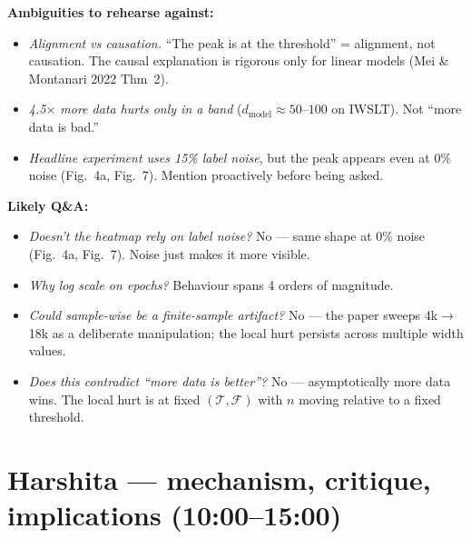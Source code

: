 \documentclass[10pt,a4paper]{article}
\newcommand{\spk}[2]{\textcolor{#1}{\textbf{#2}}}
\newcommand{\T}{\mathcal{T}}
\newcommand{\F}{\mathcal{F}}
\begin{document}
\textbf{Ambiguities to rehearse against:}
\begin{itemize}
\item \emph{Alignment vs causation.} ``The peak is at the threshold'' = alignment, not causation. The causal explanation is rigorous only for linear models (Mei \& Montanari 2022 Thm~2).
\item \emph{4.5\(\times\) more data hurts only in a band} (\(d_{\text{model}} \approx 50\text{--}100\) on IWSLT). Not ``more data is bad.''
\item \emph{Headline experiment uses 15\% label noise}, but the peak appears even at 0\% noise (Fig.~4a, Fig.~7). Mention proactively before being asked.
\end{itemize}

\textbf{Likely Q\&A:}
\begin{itemize}
\item \emph{Doesn't the heatmap rely on label noise?} No --- same shape at 0\% noise (Fig.~4a, Fig.~7). Noise just makes it more visible.
\item \emph{Why log scale on epochs?} Behaviour spans 4 orders of magnitude.
\item \emph{Could sample-wise be a finite-sample artifact?} No --- the paper sweeps 4k\(\to\)18k as a deliberate manipulation; the local hurt persists across multiple width values.
\item \emph{Does this contradict ``more data is better''?} No --- asymptotically more data wins. The local hurt is at fixed \((\T, \F)\) with \(n\) moving relative to a fixed threshold.
\end{itemize}

\section{\spk{harshcoral}{Harshita --- mechanism, critique, implications (10:00--15:00)}}
\end{document}
